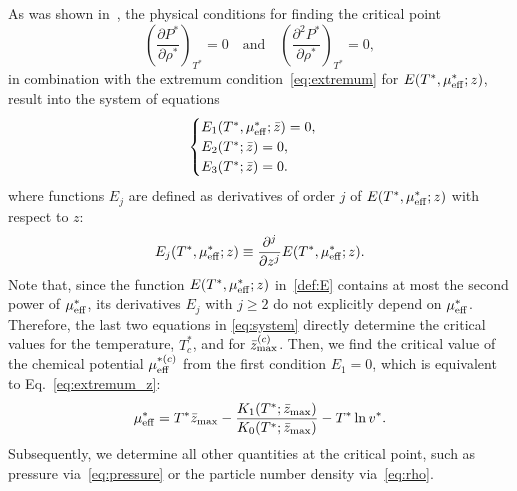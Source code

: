 \documentclass[pdflatex,sn-mathphys-num]{sn-jnl}%
\theoremstyle{thmstyleone}%
\theoremstyle{thmstyletwo}%
\theoremstyle{thmstylethree}%
\begin{document}
	As was shown in~\cite{RDKPS26a}, the physical conditions for finding the critical point
	\begin{equation}
		\left(\frac{\partial P^*}{\partial \rho^*}\right)_{T^*} = 0 \quad {\text {and} } \quad
		\left(\frac{\partial^2 P^*}{\partial \rho^*}\right)_{T^*} = 0,
	\end{equation}
	in combination with the extremum condition~\eqref{eq:extremum} for $E(T^*, \mu^*_{\rm eff}; z)$, result into the system of equations
	\begin{equation}
		\label{eq:system}
		\begin{cases}
			E_1(T^*,\mu^*_{\rm eff}; \bar{z}) = 0,\\
			E_2(T^*; \bar{z}) = 0,\\
			E_3(T^*; \bar{z}) = 0.
		\end{cases}
	\end{equation}
	where functions $E_j$ are defined as derivatives of order $j$ of $E(T^*,\mu^*_{\rm eff}; z)$ with respect to $z$:
	\begin{equation}
		E_j(T^*,\mu^*_{\rm eff}; z) \equiv \frac{\partial^j}{\partial z^j} E(T^*, \mu^*_{\rm eff}; z).
	\end{equation}
	Note that, since the function $E(T^*,\mu^*_{\rm eff};z)$ in~\eqref{def:E} contains at most the second power of $\mu^*_{\rm eff}$, its derivatives $E_j$ with $j \geq 2$ do not explicitly depend on $\mu^*_{\rm eff}$. Therefore, the last two equations in \eqref{eq:system} directly determine the critical values for the temperature, $T^*_c$, and for $\bar{z}^{(c)}_{\rm max}$. Then, we find the critical value of the chemical potential $\mu^{*(c)}_{\rm eff}$ from the first condition $E_1 = 0$, which is equivalent to Eq.~\eqref{eq:extremum_z}:
	\begin{equation}
		\mu^*_{\rm eff} = T^* \bar{z}_{\rm max} - \frac{K_1(T^*; \bar{z}_{\rm max})}{K_0(T^*; \bar{z}_{\rm max})} - T^* \ln v^*.
	\end{equation}
	Subsequently, we determine all other quantities at the critical point, such as pressure via~\eqref{eq:pressure} or the particle number density via~\eqref{eq:rho}.
	
\end{document}
